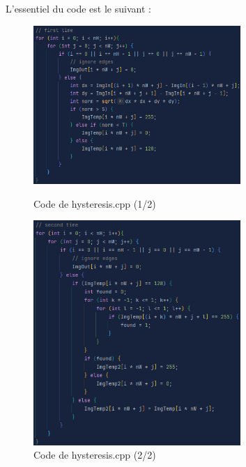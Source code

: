 \documentclass[french,a4paper,10pt]{article}
\begin{document}
    L'essentiel du code est le suivant : %
    \begin{figure}[!htb]
        \begin{minipage}{0.48\textwidth}
            \centering
            \includegraphics[width=0.7\textwidth]{out/code-hysteresis1}
            \caption{Code de hysteresis.cpp (1/2)}\label{fig:code-hysteresis1}
        \end{minipage}\hfill
        \begin{minipage}{0.48\textwidth}
            \centering
            \includegraphics[width=0.7\textwidth]{out/code-hysteresis2}
            \caption{Code de hysteresis.cpp (2/2)}\label{fig:code-hysteresis2}
        \end{minipage}
    \end{figure}
\end{document}
